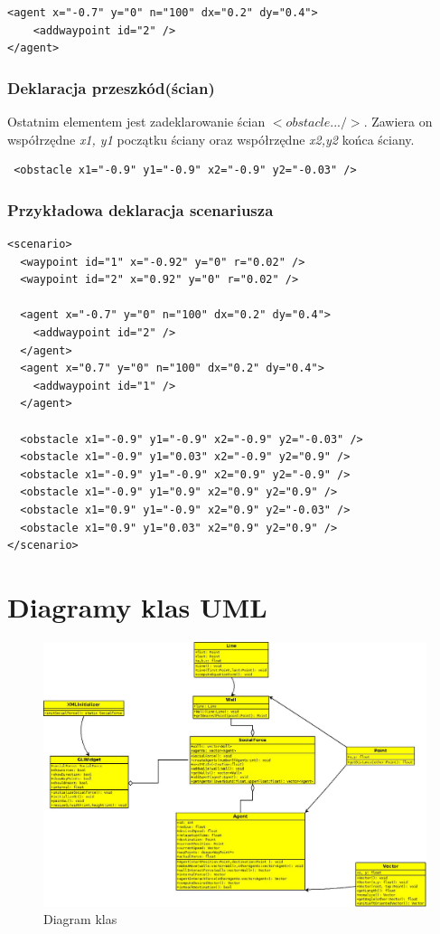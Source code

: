 \begin{lstlisting}
<agent x="-0.7" y="0" n="100" dx="0.2" dy="0.4">
    <addwaypoint id="2" />
</agent>
\end{lstlisting}

\subsubsection{Deklaracja przeszkód(ścian)}
\hspace{4ex}Ostatnim elementem jest zadeklarowanie ścian $<obstacle ... />$.
Zawiera on współrzędne \emph{x1, y1} początku ściany oraz współrzędne \emph{x2,y2} końca ściany.

\begin{lstlisting}
 <obstacle x1="-0.9" y1="-0.9" x2="-0.9" y2="-0.03" />
\end{lstlisting}




\subsubsection{Przykładowa deklaracja scenariusza}

\begin{lstlisting}
<scenario>
  <waypoint id="1" x="-0.92" y="0" r="0.02" />
  <waypoint id="2" x="0.92" y="0" r="0.02" />
  
  <agent x="-0.7" y="0" n="100" dx="0.2" dy="0.4">
    <addwaypoint id="2" />
  </agent>
  <agent x="0.7" y="0" n="100" dx="0.2" dy="0.4">
    <addwaypoint id="1" />
  </agent>
  
  <obstacle x1="-0.9" y1="-0.9" x2="-0.9" y2="-0.03" />
  <obstacle x1="-0.9" y1="0.03" x2="-0.9" y2="0.9" />
  <obstacle x1="-0.9" y1="-0.9" x2="0.9" y2="-0.9" />
  <obstacle x1="-0.9" y1="0.9" x2="0.9" y2="0.9" />
  <obstacle x1="0.9" y1="-0.9" x2="0.9" y2="-0.03" />
  <obstacle x1="0.9" y1="0.03" x2="0.9" y2="0.9" />	
</scenario>
\end{lstlisting}


\newpage
\section{Diagramy klas UML}
\hspace{4ex}
\begin{figure}[ht]
\centering
\includegraphics[scale=0.4]{ClassDiagram}
\caption{Diagram klas}
\end{figure}